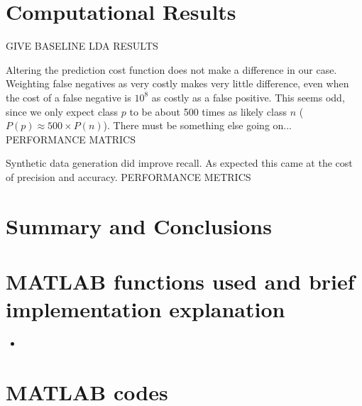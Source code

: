 \documentclass{article}
\begin{document}
\section{Computational Results}

GIVE BASELINE LDA RESULTS

Altering the prediction cost function does not make a difference in our case.
Weighting false negatives as very costly makes very little difference, even when the cost of a false negative is $10^8$ as costly as a false positive.
This seems odd, since we only expect class $p$ to be about 500 times as likely class $n$ ($P(p) \approx 500 \times P(n)$).
There must be something else going on...
PERFORMANCE MATRICS

Synthetic data generation did improve recall. As expected this came at the cost of precision and accuracy.
PERFORMANCE METRICS

\section{Summary and Conclusions}

\clearpage
\begin{appendices}
\section{MATLAB functions used and brief implementation explanation}
\begin{itemize}
	\item
\end{itemize}

\section{MATLAB codes}
%
\end{appendices}
\end{document}
